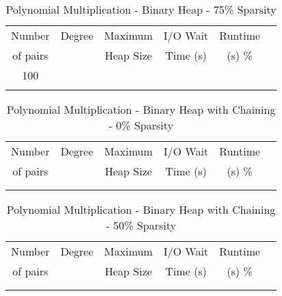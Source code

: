 \documentclass[11pt, one-sided]{amsart}
\begin{document}
\begin{table}[htbp]
   \centering
      \caption{Polynomial Multiplication - Binary Heap - 75\% Sparsity}
   \begin{tabular}{|c|c|c|c|c|c|}
   	\hline
		 Number   & 	Degree	& Maximum & I/O Wait		& Runtime 	 \\ 
		 of pairs 	&			& Heap Size	& Time (s)		&	(s)		 		\%				\\ \hline
		 100		&			&			&			&						\\
		 		&			&			&			&						\\
   \end{tabular}
   \label{tab:booktabs}
\end{table}


\newpage



\begin{table}[htbp]
   \centering
      \caption{Polynomial Multiplication - Binary Heap with Chaining - 0\% Sparsity}
   \begin{tabular}{|c|c|c|c|c|c|}
   	\hline
		 Number   & 	Degree	& Maximum & I/O Wait		& Runtime 	 \\ 
		 of pairs 	&			& Heap Size	& Time (s)		&	(s)		 		\%				\\ \hline
		 		&			&			&			&						\\
		 		&			&			&			&						\\
   \end{tabular}
   \label{tab:booktabs}
\end{table}

\begin{table}[htbp]
   \centering
      \caption{Polynomial Multiplication - Binary Heap with Chaining - 50\% Sparsity}
   \begin{tabular}{|c|c|c|c|c|c|}
   	\hline
		 Number   & 	Degree	& Maximum & I/O Wait		& Runtime 	 \\ 
		 of pairs 	&			& Heap Size	& Time (s)		&	(s)		 		\%				\\ \hline
		 		&			&			&			&						\\
		 		&			&			&			&						\\
   \end{tabular}
   \label{tab:booktabs}
\end{table}
\end{document}
